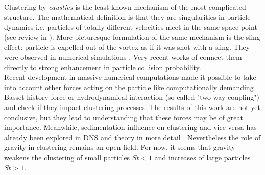 \documentclass[../main.tex]{subfiles}
\begin{document}
 Clustering by \emph{caustics} is the least known mechanism of the most complicated structure. The mathematical definition is that they are singularities in particle dynamics i.e. particles of totally different velocities meet in the same space point (see review in \citet{Gustavsson2016}). More picturesque formulation of the same mechanism is the sling effect: particle is expelled out of the vortex as if it was shot with a sling. They were observed in numerical simulations \citep{Marcu1995, Falkovich2007, Bec2011, Bewley2013}. Very recent works of \citet{Ravichandran2015, Deepu2017} connect them directly to strong enhancement in particle collision probability.
\\
Recent development in massive numerical computations made it possible to take into account other forces acting on the particle like computationally demanding Basset history force \citep{Olivieri2014} or hydrodynamical interaction \citep{Monchaux2017, Yavuz2018} (so called "two-way coupling") and check if they impact clustering processes. The results of this work are not yet conclusive, but they lead to understanding that these forces may be of great importance. Meanwhile, sedimentation influence on clustering and vice-versa has already been explored in DNS and theory in more detail \citep{Wang2006, Ayala2008, Woittiez2009, Dejoan2013, Gustavsson2014, Bec2014, Park2014, Bragg2015b, Rosa2016, Ireland2016b, Rosa_Pozorski2017,Baker2017, Tom2019, Momenifar2019}. Nevertheless the role of gravity in clustering remains an open field. For now, it seems that gravity weakens the clustering of small particles $St<1$ and increases of large particles $St>1$.
\\
\end{document}
